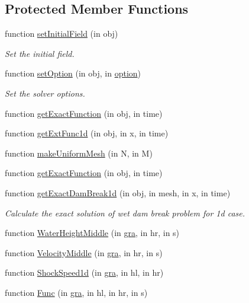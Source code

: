 \subsection*{Protected Member Functions}
\begin{DoxyCompactItemize}
\item 
function \hyperlink{class_dam_break_wet_uniform_mesh1d_a3b8b4a0a5a1fd9a5b7abb9e974149689}{set\+Initial\+Field} (in obj)
\begin{DoxyCompactList}\small\item\em Set the initial field. \end{DoxyCompactList}\item 
function \hyperlink{class_dam_break_wet_uniform_mesh1d_a881c5e4194ab1df2f708b9f9374ff377}{set\+Option} (in obj, in \hyperlink{class_ndg_phys_af91f4c54b93504e76b38a5693774dff1}{option})
\begin{DoxyCompactList}\small\item\em Set the solver options. \end{DoxyCompactList}\item 
function \hyperlink{class_dam_break_wet_uniform_mesh1d_aeb02be9dd97470eff2fac686794a79f2}{get\+Exact\+Function} (in obj, in time)
\item 
function \hyperlink{class_dam_break_wet_uniform_mesh1d_ab6e72dbd0e63d55adc8e704e7509494f}{get\+Ext\+Func1d} (in obj, in x, in time)
\item 
function \hyperlink{class_dam_break_wet_uniform_mesh1d_a62744fb0056e1600df5fdd733cc381d5}{make\+Uniform\+Mesh} (in N, in M)
\item 
function \hyperlink{class_dam_break_wet_uniform_mesh1d_aeb02be9dd97470eff2fac686794a79f2}{get\+Exact\+Function} (in obj, in time)
\item 
function \hyperlink{class_dam_break_wet_uniform_mesh1d_a6dc2971e2589dcd4fe399e91019ce89a}{get\+Exact\+Dam\+Break1d} (in obj, in mesh, in x, in time)
\begin{DoxyCompactList}\small\item\em Calculate the exact solution of wet dam break problem for 1d case. \end{DoxyCompactList}\item 
function \hyperlink{class_dam_break_wet_uniform_mesh1d_a06b258e9dc6fbed0e79c8f091508802b}{Water\+Height\+Middle} (in \hyperlink{class_dam_break_wet_uniform_mesh1d_a2bdd2015abb86266c86a08641823034a}{gra}, in hr, in s)
\item 
function \hyperlink{class_dam_break_wet_uniform_mesh1d_a62bc69c5e650b34d91c177f85d4cca69}{Velocity\+Middle} (in \hyperlink{class_dam_break_wet_uniform_mesh1d_a2bdd2015abb86266c86a08641823034a}{gra}, in hr, in s)
\item 
function \hyperlink{class_dam_break_wet_uniform_mesh1d_a5b464ba6322f6a4ed53cdbc12aef17f0}{Shock\+Speed1d} (in \hyperlink{class_dam_break_wet_uniform_mesh1d_a2bdd2015abb86266c86a08641823034a}{gra}, in hl, in hr)
\item 
function \hyperlink{class_dam_break_wet_uniform_mesh1d_a8194cbe503c2acdce11e6441cf20a18e}{Func} (in \hyperlink{class_dam_break_wet_uniform_mesh1d_a2bdd2015abb86266c86a08641823034a}{gra}, in hl, in hr, in s)
\end{DoxyCompactItemize}
